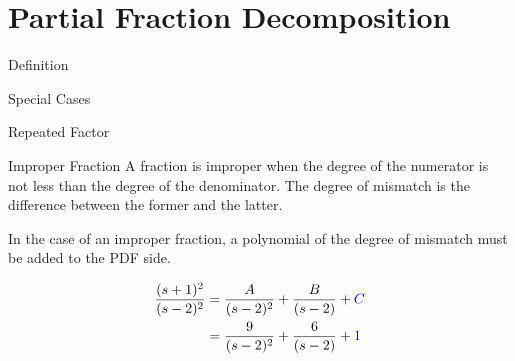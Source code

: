 \documentclass{../templates/topic}
\begin{document}
\chapter{Partial Fraction Decomposition}


\begin{section}{Definition}
\end{section}

\begin{section}{Special Cases}
	\begin{subsection}{Repeated Factor}
	\end{subsection}
	\begin{subsection}{Improper Fraction}
		A fraction is improper when the degree of the numerator is not less than the degree of the denominator. The degree of mismatch is the difference between the former and the latter.
		
		In the case of an improper fraction, a polynomial of the degree of mismatch must be added to the PDF side.
		
		\begin{align*}
			\frac{(s+1)^2}{(s-2)^2} &= \frac{A}{(s-2)^2}+\frac{B}{(s-2)}+\textcolor{blue}{C} \\
			&= \frac{9}{(s-2)^2}+\frac{6}{(s-2)}+\textcolor{blue}{1}
		\end{align*}
		
		
	\end{subsection}
\end{section}
	
\end{document}
